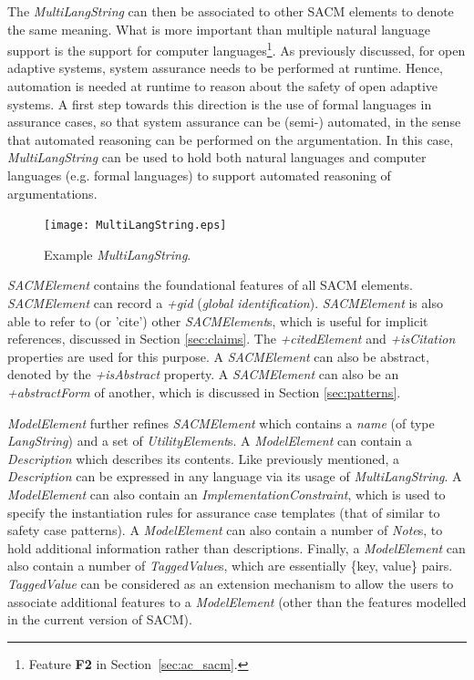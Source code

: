 The \textit{MultiLangString} can then be associated to other SACM elements to denote the same meaning. 
What is more important than multiple natural language support is the support for computer languages\footnote{Feature \textbf{F2} in Section~\ref{sec:ac_sacm}.}.
As previously discussed, for open adaptive systems, system assurance needs to be performed at runtime. 
Hence, automation is needed at runtime to reason about the safety of open adaptive systems. 
A first step towards this direction is the use of formal languages in assurance cases, so that system assurance can be (semi-) automated, in the sense that automated reasoning can be performed on the argumentation. 
In this case, \textit{MultiLangString} can be used to hold both natural languages and computer languages (e.g. formal languages) to support automated reasoning of argumentations. 

\begin{figure}
	\centering
	\texttt{[image: MultiLangString.eps]}
	\caption{Example \textit{MultiLangString}.}
	\label{fig:mulitiLang}
\end{figure}

\textit{SACMElement} contains the foundational features of all SACM elements. \textit{SACMElement} can record a \textit{+gid} (\textit{global identification}). 
\textit{SACMElement} is also able to refer to (or 'cite') other \textit{SACMElement}s, which is useful for implicit references, discussed in Section \ref{sec:claims}. 
The \textit{+citedElement} and \textit{+isCitation} properties are used for this purpose. 
A \textit{SACMElement} can also be abstract, denoted by the \textit{+isAbstract} property. 
A \textit{SACMElement} can also be an \textit{+abstractForm} of another, which is discussed in Section \ref{sec:patterns}. 

\textit{ModelElement} further refines \textit{SACMElement} which contains a \textit{name} (of type \textit{LangString}) and a set of \textit{UtilityElement}s. 
A \textit{ModelElement} can contain a \textit{Description} which describes its contents. Like previously mentioned, a \textit{Description} can be expressed in any language via its usage of \textit{MultiLangString}. 
A \textit{ModelElement} can also contain an \textit{ImplementationConstraint}, which is used to specify the instantiation rules for assurance case templates (that of similar to safety case patterns).
A \textit{ModelElement} can also contain a number of \textit{Note}s, to hold additional information rather than descriptions. 
Finally, a \textit{ModelElement} can also contain a number of \textit{TaggedValue}s, which are essentially \{key, value\} pairs. 
\textit{TaggedValue} can be considered as an extension mechanism to allow the users to associate additional features to a \textit{ModelElement} (other than the features modelled in the current version of SACM).

